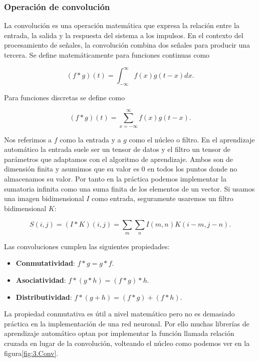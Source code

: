 \subsubsection{Operación de convolución}

La convolución es una operación matemática que expresa la relación entre la entrada, la salida y la respuesta del sistema a los impulsos. En el contexto del procesamiento de señales, la convolución combina dos señales para producir una tercera. Se define matemáticamente para funciones continuas como

$$ (f \ast g)(t) = \int_{-\infty}^{\infty} f(x)g(t-x)dx.$$

Para funciones discretas se define como

$$ (f \ast g)(t) = \sum_{x=-\infty}^{\infty} f(x)g(t-x).$$

Nos referimos a $f$ como la entrada y a $g$ como el núcleo o filtro. En el aprendizaje automático la entrada suele ser un tensor de datos y el filtro un tensor de parámetros que adaptamos con el algoritmo de aprendizaje. Ambos son de dimensión finita y asumimos que su valor es 0 en todos los puntos donde no almacenamos su valor. Por tanto en la práctica podemos implementar la sumatoria infinita como una suma finita de los elementos de un vector. Si usamos una imagen bidimensional $I$ como entrada, seguramente usaremos un filtro bidimensional $K$:

$$S(i,j) = (I \ast K)(i,j) = \sum_m \sum_n I(m,n)K(i-m,j-n).$$


Las convoluciones cumplen las siguientes propiedades:

\begin{itemize}

	\item \textbf{Conmutatividad}: $f \ast g = g \ast f$.
	
	\item \textbf{Asociatividad}: $f \ast (g \ast h ) = ( f \ast g) \ast h$.
	
	\item \textbf{Distributividad}: $f \ast (g + h) = (f \ast g) + (f \ast h)$.

\end{itemize}

La propiedad conmutativa es útil a nivel matemático pero no es demasiado práctica en la implementación de una red neuronal. Por ello muchas librerías de aprendizaje automático optan por implementar la función llamada relación cruzada en lugar de la convolución, volteando el núcleo como podemos ver en la figura\ref{fig:3.Conv}.

